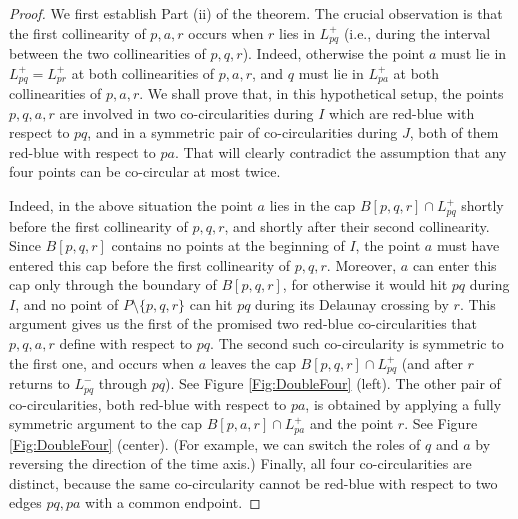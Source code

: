 \documentclass[letter,11pt]{article}
\def \L{{L}}
\begin{document}
\begin{proof}
We first establish Part (ii) of the theorem.
The crucial observation is that the first collinearity of $p,a,r$ occurs when $r$ lies in $\L_{pq}^+$ (i.e., during the interval between the two collinearities of $p,q,r$). 
Indeed, otherwise the point $a$ must lie in $\L_{pq}^+=\L_{pr}^+$ at both collinearities of $p,a,r$, and $q$ must lie in $\L_{pa}^+$ at both collinearities of $p,a,r$. 
We shall prove that, in this hypothetical setup, the points $p,q,a,r$ are involved in two co-circularities during $I$ which are red-blue with respect to $pq$, and in a symmetric pair of co-circularities during $J$, both of them red-blue with respect to $pa$. That will clearly contradict the assumption that any four points can be co-circular at most twice.

Indeed, in the above situation the point $a$ lies in the cap $B[p,q,r]\cap \L_{pq}^+$ shortly before the first collinearity of $p,q,r$, and shortly after their second collinearity. 
Since $B[p,q,r]$ contains no points at the beginning of $I$, the point $a$ must have entered this cap before the first collinearity of $p,q,r$. Moreover, $a$ can enter this cap only through the boundary of $B[p,q,r]$, for otherwise it would hit $pq$ during $I$, and no point of $P\setminus\{p,q,r\}$ can hit $pq$ during its Delaunay crossing by $r$. This argument gives us the first of the promised two red-blue co-circularities that $p,q,a,r$ define with respect to $pq$. The second such co-circularity is symmetric to the first one, and occurs when $a$ leaves the cap $B[p,q,r]\cap \L_{pq}^+$ (and after $r$ returns to $\L_{pq}^-$ through $pq$). See Figure \ref{Fig:DoubleFour} (left).
The other pair of co-circularities, both red-blue with respect to $pa$, is obtained by applying a fully symmetric argument to the cap $B[p,a,r]\cap \L_{pa}^+$ and the point $r$. See Figure \ref{Fig:DoubleFour} (center). (For example, we can switch the roles of $q$ and $a$ by reversing the direction of the time axis.)
Finally, all four co-circularities are distinct, because the same co-circularity cannot be red-blue with respect to two edges $pq,pa$ with a common endpoint. 


\end{proof}
\end{document}
